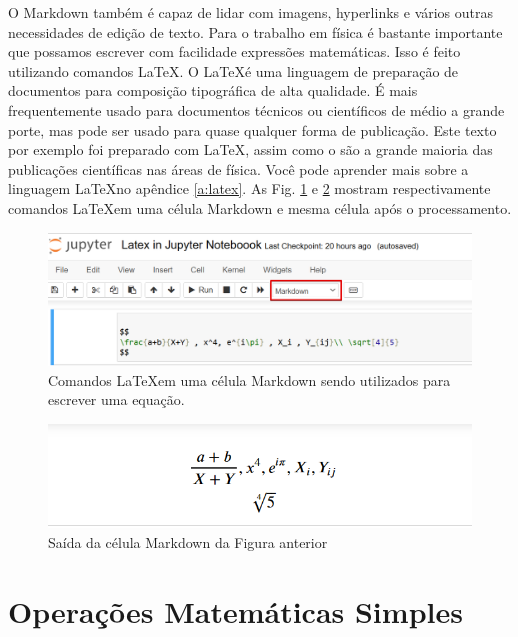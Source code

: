 O Markdown também é capaz de lidar com imagens, hyperlinks e vários outras necessidades de edição de texto. Para o trabalho em física é bastante importante que possamos escrever com facilidade expressões matemáticas. Isso é feito utilizando comandos \LaTeX. O \LaTeX é uma linguagem de preparação de documentos para composição tipográfica de alta qualidade. É mais frequentemente usado para documentos técnicos ou científicos de médio a grande porte, mas pode ser usado para quase qualquer forma de publicação. Este texto por exemplo foi preparado com \LaTeX, assim como o são a grande maioria das publicações científicas nas áreas de física. Você pode aprender mais sobre a linguagem \LaTeX no apêndice \ref{a:latex}. As Fig. \ref{fig:JN-Latex-in} e \ref{fig:JN-Latex-out} mostram respectivamente comandos \LaTeX em uma célula Markdown e mesma célula após o processamento.
\begin{figure}[h!]
\centering
\includegraphics[scale=0.45]{Images/word-image-751.png}
\caption{Comandos \LaTeX em uma célula Markdown sendo utilizados para escrever uma equação.} \label{fig:JN-Latex-in}
\end{figure}
\begin{figure}[h!]
\centering
\includegraphics[scale=0.5]{Images/word-image-752.png}
\caption{Saída da célula Markdown da Figura anterior} \label{fig:JN-Latex-out}
\end{figure}

\section{Operações Matemáticas Simples}\label{sc:ops}

